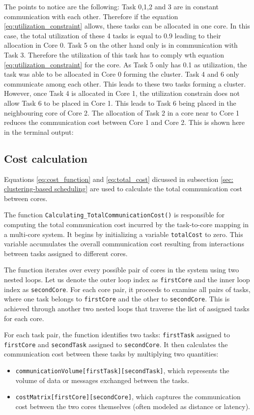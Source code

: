 \documentclass[conference]{IEEEtran}
\begin{document}
The points to notice are the following: Task 0,1,2 and 3 are in constant communication with each other. Therefore if the equation \ref{eq:utilization_constraint} allows, these tasks can be allocated in one core. In this case, the total utilization of these 4 tasks is equal to 0.9 leading to their allocation in Core 0. Task 5 on the other hand only is in communication with Task 3. Therefore the utilization of this task has to comply wth equation \ref{eq:utilization_constraint} for the core. As Task 5 only has 0.1 as utilization, the task was able to be allocated in Core 0 forming the cluster. Task 4 and 6 only communicate among each other. This leads to these two tasks forming a cluster. However, once Task 4 is allocated in Core 1, the utilization constrain does not allow Task 6 to be placed in Core 1. This leads to Task 6 being placed in the neighbouring core of Core 2. The allocation of Task 2 in a core near to Core 1 reduces the communication cost between Core 1 and Core 2.
 This is shown here in the terminal output:

\subsection{Cost calculation}
\label{subsec: cost calculation}
Equations \ref{eq:cost_function} and \ref{eq:total_cost} dicussed in subsection \ref{sec: clustering-based scheduling} are used to calculate the total communication cost between cores. 

The function \texttt{Calculating\_TotalCommunicationCost()} is responsible for computing the total communication cost incurred by the task-to-core mapping in a multi-core system. It begins by initializing a variable \texttt{totalCost} to zero. This variable accumulates the overall communication cost resulting from interactions between tasks assigned to different cores.

The function iterates over every possible pair of cores in the system using two nested loops. Let us denote the outer loop index as \texttt{firstCore} and the inner loop index as \texttt{secondCore}. For each core pair, it proceeds to examine all pairs of tasks, where one task belongs to \texttt{firstCore} and the other to \texttt{secondCore}. This is achieved through another two nested loops that traverse the list of assigned tasks for each core.

For each task pair, the function identifies two tasks: \texttt{firstTask} assigned to \texttt{firstCore} and \texttt{secondTask} assigned to \texttt{secondCore}. It then calculates the communication cost between these tasks by multiplying two quantities:
\begin{itemize}
    \item \texttt{communicationVolume[firstTask][secondTask]}, which represents the volume of data or messages exchanged between the tasks.
    \item \texttt{costMatrix[firstCore][secondCore]}, which captures the communication cost between the two cores themselves (often modeled as distance or latency).
\end{itemize}
\end{document}
